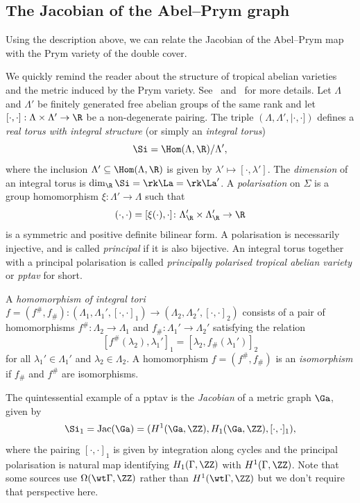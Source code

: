 \subsection{The Jacobian of the Abel--Prym graph}\label{sec:JacobianVSPrym}


Using the description above, we can relate the Jacobian of the Abel--Prym map with the Prym variety of the double cover. 

We quickly remind the reader about the structure of tropical abelian varieties and the metric induced by the Prym variety. See~\cite[Section $2$]{LZ22} and~\cite[Section $4$]{RZ_ngonal} for more details. Let $\Lambda$ and $\Lambda'$ be finitely generated free abelian groups of the same rank and let $[\cdot, \cdot] : \Lambda \times \Lambda' \to \R$ be a non-degenerate pairing. The triple $(\Lambda, \Lambda', |\cdot, \cdot])$ defines a \emph{real torus with integral structure} (or simply an \emph{integral torus})  
 \[
 \Si=\Hom(\Lambda, \R) / \Lambda',
 \]
 where the inclusion $\Lambda' \subseteq \Hom(\Lambda, \R)$ is given by $\lambda' \mapsto [\cdot,\lambda']$.
The \emph{dimension} of an integral torus is $\dim_{\R}\Si=\rk \La=\rk \La'$. 
 A \emph{polarisation} on $\Sigma$ is a group homomorphism $\xi : \Lambda' \to \Lambda$ such that 
 \[
 (\cdot,\cdot) = [\xi(\cdot), \cdot] \colon \Lambda'_\R \times \Lambda'_\R \to \R
 \]
 is a symmetric and positive definite bilinear form. A polarisation is necessarily injective, and is called \emph{principal} if it is also bijective.
  An integral torus together with a principal polarisation is called \emph{principally polarised tropical abelian variety} or \emph{pptav} for short.


A \emph{homomorphism of integral tori} $f=(f^{\#},f_{\#})\colon (\Lambda_1,\Lambda_1',[\cdot,\cdot]_1)\to (\Lambda_2,\Lambda_2',[\cdot,\cdot]_2)$ consists of a pair of homomorphisms $f^{\#}\colon \Lambda_2\to \Lambda_1$
and $f_{\#}\colon \Lambda_1'\to \Lambda_2'$
satisfying the relation 
\[
[f^{\#}(\lambda_2),\lambda_1']_1=[\lambda_2,f_{\#}(\lambda_1')]_2
\]
for all $\lambda_1'\in\Lambda_1'$ and $\lambda_2\in \Lambda_2$.
A homomorphism $f=(f^{\#},f_{\#})$ is an \emph{isomorphism} if $f_{\#}$ and $f^{\#}$
are isomorphisms.

The quintessential example of a pptav is the  \emph{Jacobian} of a metric graph $\Ga$, given by
\[
\Si_1=\mathrm{Jac}(\Ga)=(H^1(\Ga,\ZZ),H_1(\Ga,\ZZ),[\cdot,\cdot]_1),
\] 
where the pairing $[\cdot,\cdot]_1$ is given by integration along cycles and the principal polarisation is natural map identifying  $H_1(\Gamma,\ZZ)$ with $H^1(\Gamma,\ZZ)$. Note that some sources use $\Omega(\wt\Gamma,\ZZ)$ rather than $H^1(\wt\Gamma,\ZZ)$ but we don't require that perspective here. 


